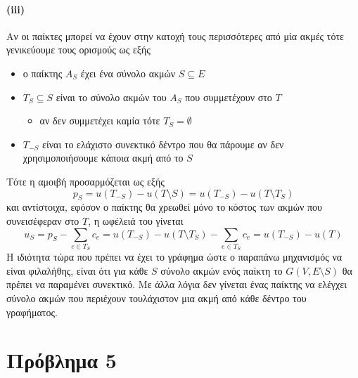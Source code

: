 \documentclass[a4paper,11pt]{article}
\begin{document}

\paragraph{(iii)}
Αν οι παίκτες μπορεί να έχουν στην κατοχή τους περισσότερες από μία ακμές τότε γενικεύουμε τους ορισμούς ως εξής
\begin{itemize}
	\item ο παίκτης $A_S$ έχει ένα σύνολο ακμών $S \subseteq E$
	\item $T_S \subseteq S$ είναι το σύνολο ακμών του $A_S$ που συμμετέχουν στο $T$ 
		\begin{itemize}
			\item αν δεν συμμετέχει καμία τότε $T_S=\emptyset$
		\end{itemize}
	\item $T_{-S}$ είναι το ελάχιστο συνεκτικό δέντρο που θα πάρουμε αν δεν χρησιμοποιήσουμε κάποια ακμή από το $S$
\end{itemize}
Τότε η αμοιβή προσαρμόζεται ως εξής
\[p_S = u(T_{-S}) - u(T \setminus S) = u(T_{-S}) - u(T \setminus T_S)\]
και αντίστοιχα, εφόσον ο παίκτης θα χρεωθεί μόνο το κόστος των ακμών που συνεισέφεραν στο $T$, η ωφέλειά του γίνεται
\[u_S = p_S - \sum_{e\in T_S} c_e = u(T_{-S}) - u(T \setminus T_S) -  \sum_{e\in T_S} c_e = u(T_{-S}) - u(T)\]
Η ιδιότητα τώρα που πρέπει να έχει το γράφημα ώστε ο παραπάνω μηχανισμός να είναι φιλαλήθης, είναι ότι για κάθε $S$ σύνολο ακμών ενός παίκτη το $G(V,E \setminus S)$ θα πρέπει να παραμένει συνεκτικό.
Με άλλα λόγια δεν γίνεται ένας παίκτης να ελέγχει σύνολο ακμών που περιέχουν τουλάχιστον μια ακμή από κάθε δέντρο του γραφήματος.


\section*{Πρόβλημα 5}
\end{document}
